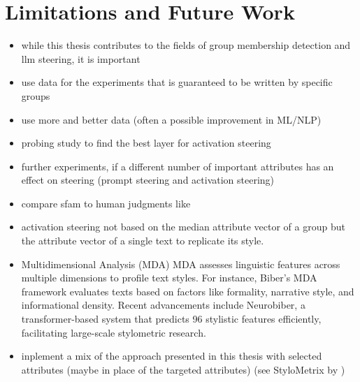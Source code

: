 \section{Limitations and Future Work}
\begin{itemize}
  \item while this thesis contributes to the fields of group membership detection and \ac{llm} steering, it is important
\end{itemize}
\begin{itemize}
  \item use data for the experiments that is guaranteed to be written by specific groups
  \item use more and better data (often a possible improvement in ML/NLP)
  \item probing study to find the best layer for activation steering
  \item further experiments, if a different number of important attributes has an effect on steering (prompt steering and activation steering)
  \item compare \ac{sfam} to human judgments like \citet{patelLearningInterpretableStyle2023}
  \item activation steering not based on the median attribute vector of a group but the attribute vector of a single text to replicate its style.
  \item Multidimensional Analysis (MDA) \newline
        MDA assesses linguistic features across multiple dimensions to profile text styles. For instance, Biber's MDA framework evaluates texts based on factors like formality, narrative style, and informational density. Recent advancements include Neurobiber, a transformer-based system that predicts 96 stylistic features efficiently, facilitating large-scale stylometric research.
  \item inplement a mix of the approach presented in this thesis with selected attributes (maybe in place of the targeted attributes) (see StyloMetrix by \citet{okulskaStyloMetrixOpensourceMultilingual2023})
\end{itemize}
